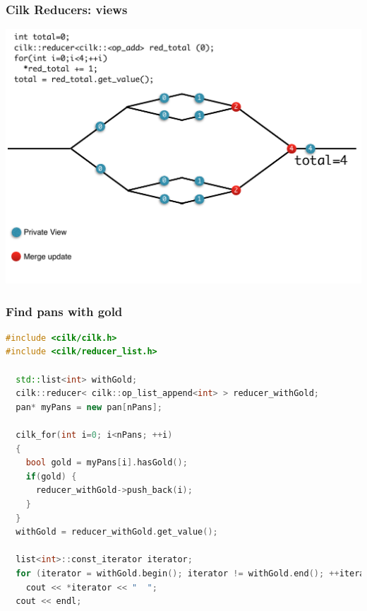 \documentclass[fleqn,xcolor=table,10pt,final]{beamer}
\begin{document}
\begin{frame}
  \frametitle{Cilk Reducers: views}
  \includegraphics[width=\textwidth]{figures/reduce}
\end{frame}


\begin{frame}[fragile]
  \frametitle{Find pans with gold}
  \begin{lstlisting}[language=C++,basicstyle=\scriptsize]
#include <cilk/cilk.h>
#include <cilk/reducer_list.h>

  std::list<int> withGold;
  cilk::reducer< cilk::op_list_append<int> > reducer_withGold;
  pan* myPans = new pan[nPans];

  cilk_for(int i=0; i<nPans; ++i)
  {
    bool gold = myPans[i].hasGold();
    if(gold) {
      reducer_withGold->push_back(i);
    }
  }
  withGold = reducer_withGold.get_value();

  list<int>::const_iterator iterator;
  for (iterator = withGold.begin(); iterator != withGold.end(); ++iterator)
    cout << *iterator << "  ";
  cout << endl;
  \end{lstlisting}
\end{frame}
\end{document}
